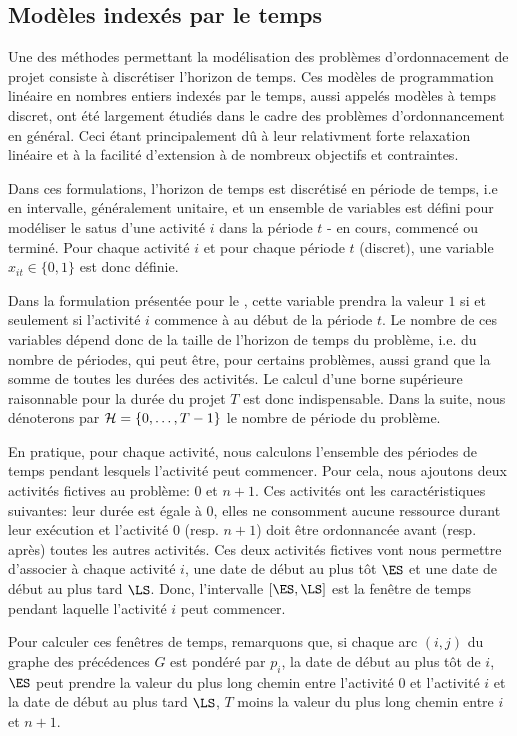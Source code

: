 \subsection{Modèles indexés par le temps}
\label{sec:time_RCPSP}

Une des méthodes permettant la modélisation des problèmes
d'ordonnacement de projet consiste à discrétiser l'horizon de
temps. Ces modèles de programmation linéaire en nombres entiers
indexés par le temps, aussi appelés modèles à temps discret, ont été
largement étudiés dans le cadre des problèmes d'ordonnancement en
général. Ceci étant principalement dû à leur relativment forte
relaxation linéaire et à la facilité d’extension à de nombreux
objectifs et contraintes.

Dans ces formulations, l'horizon de temps est discrétisé en période de
temps, i.e en intervalle, généralement unitaire, et un
ensemble de variables est défini pour modéliser le satus d'une
activité $i$ dans la période $t$ - en cours, commencé ou terminé. Pour
chaque activité $i$ et pour chaque période $t$ (discret), une variable
$x_{it} \in \{0,1\}$ est donc définie.

Dans la formulation présentée pour le \RCPSP, cette variable prendra
la valeur $1$ si et seulement si l'activité $i$ commence à au début de
la période $t$. Le nombre de ces variables dépend donc de la taille de
l'horizon de temps du problème, i.e. du nombre de périodes, qui peut
être, pour certains problèmes, aussi grand que la somme de toutes les
durées des activités. Le calcul d'une borne supérieure raisonnable
pour la durée du projet $T$ est donc indispensable.  Dans la suite,
nous dénoterons par ${\cal H}=\{0,\dots,T-1\}$ le nombre de période du
problème.

En pratique, pour chaque activité, nous calculons l'ensemble des
périodes de temps pendant lesquels l'activité peut commencer. Pour
cela, nous ajoutons deux activités fictives au problème: $0$ et
$n+1$. Ces activités ont les caractéristiques suivantes: leur
durée est égale à 0, elles ne consomment aucune ressource durant
leur exécution et l'activité $0$ (resp. $n+1$) doit être
ordonnancée avant (resp. après) toutes les autres activités. Ces
deux activités fictives vont nous permettre d'associer à chaque
activité $i$, une date de début au plus tôt $\ES$ et une date de
début au plus tard $\LS$. Donc, l'intervalle $[\ES,\LS]$ est la
fenêtre de temps pendant laquelle l'activité $i$ peut commencer.

Pour calculer ces fenêtres de temps, remarquons que, si chaque
arc $(i,j)$ du graphe des précédences $G$ est pondéré par
$p_i$, la date de début au plus tôt de $i$, $\ES$ peut prendre la
valeur du plus long chemin entre l'activité $0$ et l'activité $i$
et la date de début au plus tard $\LS$, $T$ moins la valeur du
plus long chemin entre $i$ et $n+1$.

